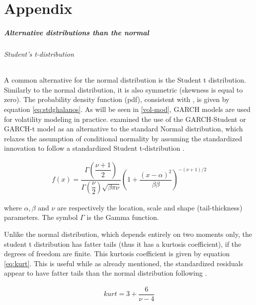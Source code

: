 \documentclass[a4paper, twoside]{templates/ociamthesis}
\begin{document}
\hypertarget{appendix}{%
\chapter{Appendix}\label{appendix}}

\hypertarget{conditional-distributions}{%
\paragraph{Alternative distributions than the normal}\label{conditional-distributions}}

\hypertarget{students-t-distribution}{%
\subparagraph{Student's t-distribution}\label{students-t-distribution}}

\noindent A common alternative for the normal distribution is the Student t distribution. Similarly to the normal distribution, it is also symmetric (skewness is equal to zero). The probability density function (pdf), consistent with \textcite{ghalanos2020}, is given by equation \eqref{eq:stdghalanos}. As will be seen in \ref{vol-mod}, GARCH models are used for volatility modeling in practice. \textcite{bollerslev1987} examined the use of the GARCH-Student or GARCH-t model as an alternative to the standard Normal distribution, which relaxes the assumption of conditional normality by assuming the standardized innovation to follow a standardized Student t-distribution \autocite{bollerslev2008}.

\begin{align}
f(x) = \dfrac{\Gamma(\dfrac{\nu+1}{2})}{\Gamma(\dfrac{\nu}{2})\sqrt{\beta \pi \nu}} \left(1+\dfrac{(x-\alpha)^2}{\beta \beta}\right)^{-(\nu+1)/2}
 \label{eq:stdghalanos}
\end{align}

\noindent where \(\alpha, \beta\) and \(\nu\) are respectively the location, scale and shape (tail-thickness) parameters. The symbol \(\Gamma\) is the Gamma function.

\noindent Unlike the normal distribution, which depends entirely on two moments only, the student t distribution has fatter tails (thus it has a kurtosis coefficient), if the degrees of freedom are finite. This kurtosis coefficient is given by equation \eqref{eq:kurt}. This is useful while as already mentioned, the standardized residuals appear to have fatter tails than the normal distribution following \textcite{bollerslev2008}.

\begin{align}
kurt = 3 + \dfrac{6}{\nu-4}
 \label{eq:kurt}
\end{align}
\end{document}
